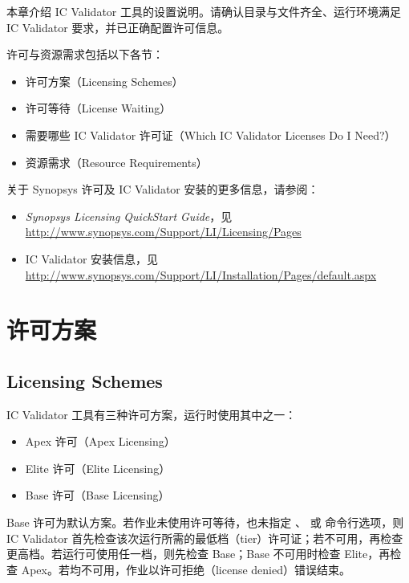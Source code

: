 \label{chap:licensing}

本章介绍 IC Validator 工具的设置说明。请确认目录与文件齐全、运行环境满足 IC Validator 要求，并已正确配置许可信息。

许可与资源需求包括以下各节：
\begin{itemize}
  \item 许可方案（Licensing Schemes）
  \item 许可等待（License Waiting）
  \item 需要哪些 IC Validator 许可证（Which IC Validator Licenses Do I Need?）
  \item 资源需求（Resource Requirements）
\end{itemize}

关于 Synopsys 许可及 IC Validator 安装的更多信息，请参阅：
\begin{itemize}
  \item \textit{Synopsys Licensing QuickStart Guide}，见\\
        \url{http://www.synopsys.com/Support/LI/Licensing/Pages}
  \item IC Validator 安装信息，见\\
        \url{http://www.synopsys.com/Support/LI/Installation/Pages/default.aspx}
\end{itemize}

\section{许可方案}
\subsection*{Licensing Schemes}

IC Validator 工具有三种许可方案，运行时使用其中之一：
\begin{itemize}
  \item Apex 许可（Apex Licensing）
  \item Elite 许可（Elite Licensing）
  \item Base 许可（Base Licensing）
\end{itemize}

Base 许可为默认方案。若作业未使用许可等待，也未指定 、 或  命令行选项，则 IC Validator 首先检查该次运行所需的最低档（tier）许可证；若不可用，再检查更高档。若运行可使用任一档，则先检查 Base；Base 不可用时检查 Elite，再检查 Apex。若均不可用，作业以许可拒绝（license denied）错误结束。

